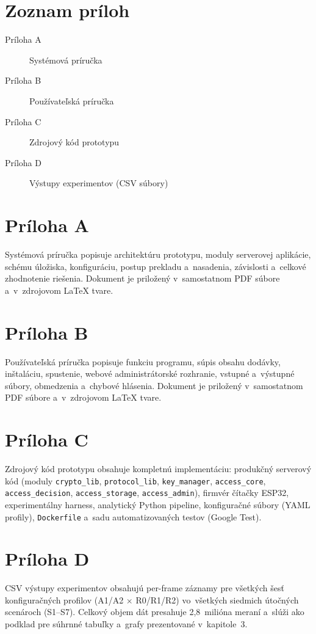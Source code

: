 
\newpage
{}
{}
\section*{Zoznam príloh}

\begin{description}
  \item[Príloha A] Systémová príručka
  \item[Príloha B] Používateľská príručka
  \item[Príloha C] Zdrojový kód prototypu
  \item[Príloha D] Výstupy experimentov (CSV súbory)
\end{description}

\newpage
\section*{Príloha A}

Systémová príručka popisuje architektúru prototypu, moduly serverovej aplikácie, schému úložiska, konfiguráciu, postup prekladu a~nasadenia, závislosti a~celkové zhodnotenie riešenia. Dokument je priložený v~samostatnom PDF súbore a~v~zdrojovom \LaTeX{} tvare.

\newpage
\section*{Príloha B}

Používateľská príručka popisuje funkciu programu, súpis obsahu dodávky, inštaláciu, spustenie, webové administrátorské rozhranie, vstupné a~výstupné súbory, obmedzenia a~chybové hlásenia. Dokument je priložený v~samostatnom PDF súbore a~v~zdrojovom \LaTeX{} tvare.

\newpage
\section*{Príloha C}

Zdrojový kód prototypu obsahuje kompletnú implementáciu: produkčný serverový kód (moduly \texttt{crypto\_lib}, \texttt{protocol\_lib}, \texttt{key\_manager}, \texttt{access\_core}, \texttt{access\_decision}, \texttt{access\_storage}, \texttt{access\_admin}), firmvér čítačky ESP32, experimentálny harness, analytický Python pipeline, konfiguračné súbory (YAML profily), \texttt{Dockerfile} a~sadu automatizovaných testov (Google Test).

\newpage
\section*{Príloha D}

CSV výstupy experimentov obsahujú per-frame záznamy pre všetkých šesť konfiguračných profilov (A1/A2 $\times$ R0/R1/R2) vo~všetkých siedmich útočných scenároch (S1--S7). Celkový objem dát presahuje 2{,}8~milióna meraní a~slúži ako podklad pre súhrnné tabuľky a~grafy prezentované v~kapitole~3.
